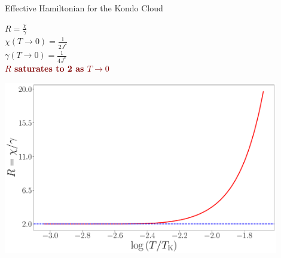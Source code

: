 \documentclass[aspectratio=169]{beamer}
\newcommand{\focus}[1]{\textcolor{maroon}{\textbf{#1}}}
\begin{document}
\begin{frame}[noframenumbering]{Effective Hamiltonian for the Kondo Cloud}
{\begin{minipage}{0.35\textwidth}
\begin{flushleft}
	\(R = \frac{\chi}{\gamma}\)\\[15pt]
	\(\chi(T \to 0) = \frac{1}{2J^*}\)\\[15pt]
	\(\gamma(T \to 0) = \frac{1}{4J^*}\)\\[15pt]
	\focus{\(R\) saturates to 2 as \(T \to 0\)}
\end{flushleft}
\end{minipage}
\hspace*{\fill}
\begin{minipage}{0.6\textwidth}
\includegraphics[width=0.9\textwidth]{figures/wilsonratio.pdf}
\end{minipage}
}
\end{frame}
\end{document}
